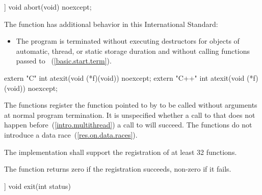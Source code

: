 %
\begin{itemdecl}
[[noreturn]] void abort(void) noexcept;
\end{itemdecl}

\begin{itemdescr}
\pnum
The function
has additional behavior in this International Standard:

\begin{itemize}
\item
The program is terminated without executing destructors for objects of
automatic, thread, or static storage
duration and without calling functions passed to
~(\ref{basic.start.term}).
%
%
\end{itemize}
\end{itemdescr}

\begin{itemdecl}
extern "C" int atexit(void (*f)(void)) noexcept;
extern "C++" int atexit(void (*f)(void)) noexcept;
\end{itemdecl}

\begin{itemdescr}
\pnum
\effects
The
functions register the function pointed to by 
to be called without arguments at normal program termination.
It is unspecified whether a call to  that does not
happen before~(\ref{intro.multithread}) a call to  will succeed.
\enternote The  functions do not introduce a data
race~(\ref{res.on.data.races}). \exitnote

\pnum
\implimits
The implementation shall support the registration of at least 32 functions.

\pnum
\returns
The
function returns zero if the registration succeeds,
non-zero if it fails.
\end{itemdescr}

%
\begin{itemdecl}
[[noreturn]] void exit(int status)
\end{itemdecl}

